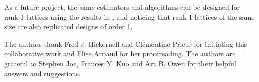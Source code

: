 
As a future project, the same estimators and algorithms can be designed for rank-1 lattices using the results in \cite{JimHic}, and noticing that rank-1 lattices of the same size are also replicated designs of order 1. 

\begin{acknowledgements}
The authors thank Fred J. Hickernell and Cl\'ementine Prieur for initiating this collaborative work and Elise Arnaud for her proofreading. The authors are grateful to Stephen Joe, Frances Y. Kuo and Art B. Owen for their helpful answers and suggestions.   
\end{acknowledgements}


